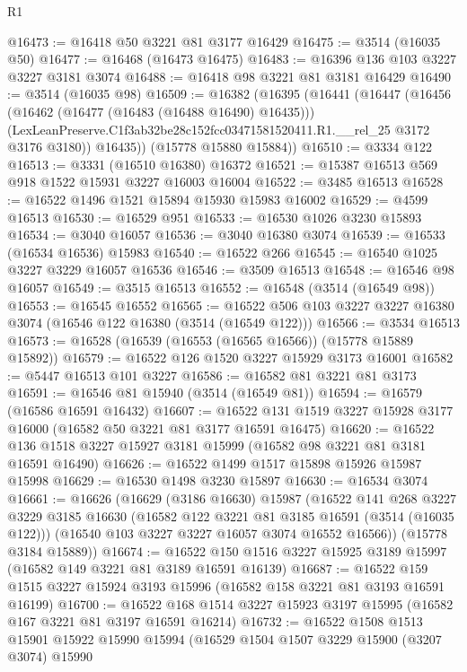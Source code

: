 \begin{lexlean}{R1}
\begin{coremodule}
@16473 := @16418 @50 @3221 @81 @3177 @16429
@16475 := @3514 (@16035 @50)
@16477 := @16468 (@16473 @16475)
@16483 := @16396 @136 @103 @3227 @3227 @3181 @3074
@16488 := @16418 @98 @3221 @81 @3181 @16429
@16490 := @3514 (@16035 @98)
@16509 := @16382
    (@16395
      (@16441
        (@16447
          (@16456
            (@16462 (@16477 (@16483 (@16488 @16490) @16435)))
            (LexLeanPreserve.C1f3ab32be28c152fcc03471581520411.R1.__rel_25 @3172 @3176 @3180))
          @16435))
      (@15778 @15880 @15884))
@16510 := @3334 @122
@16513 := @3331 (@16510 @16380) @16372
@16521 := @15387 @16513 @569 @918 @1522 @15931 @3227 @16003 @16004
@16522 := @3485 @16513
@16528 := @16522 @1496 @1521 @15894 @15930 @15983 @16002
@16529 := @4599 @16513
@16530 := @16529 @951
@16533 := @16530 @1026 @3230 @15893
@16534 := @3040 @16057
@16536 := @3040 @16380 @3074
@16539 := @16533 (@16534 @16536) @15983
@16540 := @16522 @266
@16545 := @16540 @1025 @3227 @3229 @16057 @16536
@16546 := @3509 @16513
@16548 := @16546 @98 @16057
@16549 := @3515 @16513
@16552 := @16548 (@3514 (@16549 @98))
@16553 := @16545 @16552
@16565 := @16522 @506 @103 @3227 @3227 @16380 @3074 (@16546 @122 @16380 (@3514 (@16549 @122)))
@16566 := @3534 @16513
@16573 := @16528 (@16539 (@16553 (@16565 @16566)) (@15778 @15889 @15892))
@16579 := @16522 @126 @1520 @3227 @15929 @3173 @16001
@16582 := @5447 @16513 @101 @3227
@16586 := @16582 @81 @3221 @81 @3173
@16591 := @16546 @81 @15940 (@3514 (@16549 @81))
@16594 := @16579 (@16586 @16591 @16432)
@16607 := @16522 @131 @1519 @3227 @15928 @3177 @16000 (@16582 @50 @3221 @81 @3177 @16591 @16475)
@16620 := @16522 @136 @1518 @3227 @15927 @3181 @15999 (@16582 @98 @3221 @81 @3181 @16591 @16490)
@16626 := @16522 @1499 @1517 @15898 @15926 @15987 @15998
@16629 := @16530 @1498 @3230 @15897
@16630 := @16534 @3074
@16661 := @16626
    (@16629
      (@3186 @16630)
      @15987
      (@16522
        @141
        @268
        @3227
        @3229
        @3185
        @16630
        (@16582 @122 @3221 @81 @3185 @16591 (@3514 (@16035 @122)))
        (@16540 @103 @3227 @3227 @16057 @3074 @16552 @16566))
      (@15778 @3184 @15889))
@16674 := @16522 @150 @1516 @3227 @15925 @3189 @15997 (@16582 @149 @3221 @81 @3189 @16591 @16139)
@16687 := @16522 @159 @1515 @3227 @15924 @3193 @15996 (@16582 @158 @3221 @81 @3193 @16591 @16199)
@16700 := @16522 @168 @1514 @3227 @15923 @3197 @15995 (@16582 @167 @3221 @81 @3197 @16591 @16214)
@16732 := @16522
    @1508
    @1513
    @15901
    @15922
    @15990
    @15994
    (@16529
      @1504
      @1507
      @3229
      @15900
      (@3207 @3074)
      @15990

\end{coremodule}
\end{lexlean}
